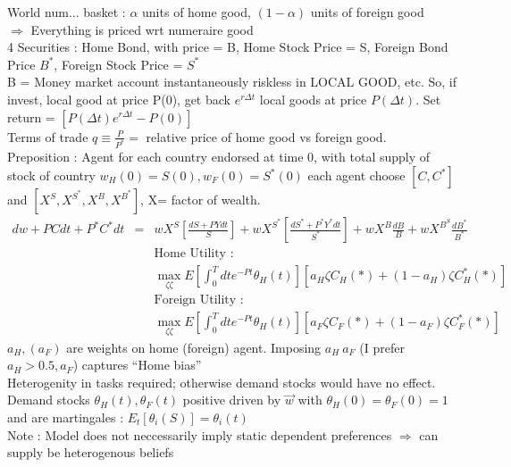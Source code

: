 \documentclass[]{article}
\begin{document}
World num... basket : $\alpha $ units of home good, $(1-\alpha)$ units of foreign good\\
$\Rightarrow $ Everything is priced wrt numeraire good\\

4 Securities : Home Bond, with price = B, Home Stock Price = S, Foreign Bond Price $B^*$, Foreign Stock Price = $S^*$\\

B = Money market account instantaneously riskless in LOCAL GOOD, etc. So, if invest, local good at price P(0), get back $e^{r \Delta t}$ local goods at price $P(\Delta t)$. Set return = $\left[P(\Delta t) e^{r\Delta t} - P(0)\right]$\\

Terms of trade $q \equiv \frac{P}{P^*} =$ relative price of home good vs foreign good.\\
Preposition : Agent for each country endorsed at time 0, with total supply of stock of country $w_H(0) = S(0), w_F(0)=S^*(0)$ each agent choose $[C,C^*]$ and $[X^S, X^{S^*}, X^B, X^{B^*}]$, X= factor of wealth.
\begin{eqnarray*}
dw + PC dt + P^*C^*dt &=& wX^S \left[\frac{dS + PYdt}{S}\right] + wX^{S^*} \left[\frac{dS^* + P^*Y^*dt}{S^*}\right] + wX^B \frac{dB}{B} + wX^{B^S} \frac{dB^*}{B^*}\\
&& \mbox{Home Utility : }\\
&& \max_{\zeta\zeta} E \left[\int_0^T dt e^{-Pt} \theta_H(t)\right] \left[a_H \zeta C_H(*) + (1-a_H) \zeta C_H^*(*)\right]\\
&& \mbox{Foreign Utility : }\\
&& \max_{\zeta\zeta} E \left[\int_0^T dt e^{-Pt} \theta_H(t)\right] \left[a_F \zeta C_F(*) + (1-a_F) \zeta C_F^*(*)\right]
\end{eqnarray*}
$a_H, (a_F) $ are weights on home (foreign) agent. Imposing $a_H \> a_F $ (I prefer $a_H>0.5, a_F$) captures ``Home bias''\\

Heterogenity in tasks required; otherwise demand stocks would have no effect.\\

Demand stocks $\theta_H(t), \theta_F(t)$ positive driven by $\vec{w}$ with $\theta_H(0) = \theta_F(0) = 1$ and are martingales : $E_t[\theta_i(S)] = \theta_i(t)$\\

Note : Model does not neccessarily imply static dependent preferences $\Rightarrow $ can supply be heterogenous beliefs\\
 
\end{document}
